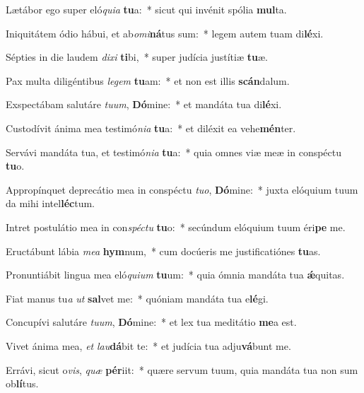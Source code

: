 \item Lætábor ego super eló\textit{qui}\textit{a} \textbf{tu}a:~* sicut qui invénit spólia \textbf{mul}ta.
\item Iniquitátem ódio hábui, et ab\textit{o}\textit{mi}\textbf{ná}tus sum:~* legem autem tuam di\textbf{lé}xi.
\item Sépties in die laudem \textit{di}\textit{xi} \textbf{ti}bi,~* super judícia justítiæ \textbf{tu}æ.
\item Pax multa diligéntibus \textit{le}\textit{gem} \textbf{tu}am:~* et non est illis \textbf{scán}dalum.
\item Exspectábam salutáre \textit{tu}\textit{um}, \textbf{Dó}mine:~* et mandáta tua di\textbf{lé}xi.
\item Custodívit ánima mea testimó\textit{ni}\textit{a} \textbf{tu}a:~* et diléxit ea vehe\textbf{mén}ter.
\item Servávi mandáta tua, et testimó\textit{ni}\textit{a} \textbf{tu}a:~* quia omnes viæ meæ in conspéctu \textbf{tu}o.
\item Appropínquet deprecátio mea in conspéctu \textit{tu}\textit{o}, \textbf{Dó}mine:~* juxta elóquium tuum da mihi intel\textbf{léc}tum.
\item Intret postulátio mea in con\textit{spéc}\textit{tu} \textbf{tu}o:~* secúndum elóquium tuum éri\textbf{pe} me.
\item Eructábunt lábia \textit{me}\textit{a} \textbf{hym}num,~* cum docúeris me justificatiónes \textbf{tu}as.
\item Pronuntiábit lingua mea eló\textit{qui}\textit{um} \textbf{tu}um:~* quia ómnia mandáta tua \textbf{ǽ}quitas.
\item Fiat manus tu\textit{a} \textit{ut} \textbf{sal}vet me:~* quóniam mandáta tua e\textbf{lé}gi.
\item Concupívi salutáre \textit{tu}\textit{um}, \textbf{Dó}mine:~* et lex tua meditátio \textbf{me}a est.
\item Vivet ánima mea, \textit{et} \textit{lau}\textbf{dá}bit te:~* et judícia tua adju\textbf{vá}bunt me.
\item Errávi, sicut o\textit{vis}, \textit{quæ} \textbf{pér}iit:~* quære servum tuum, quia mandáta tua non sum ob\textbf{lí}tus.
